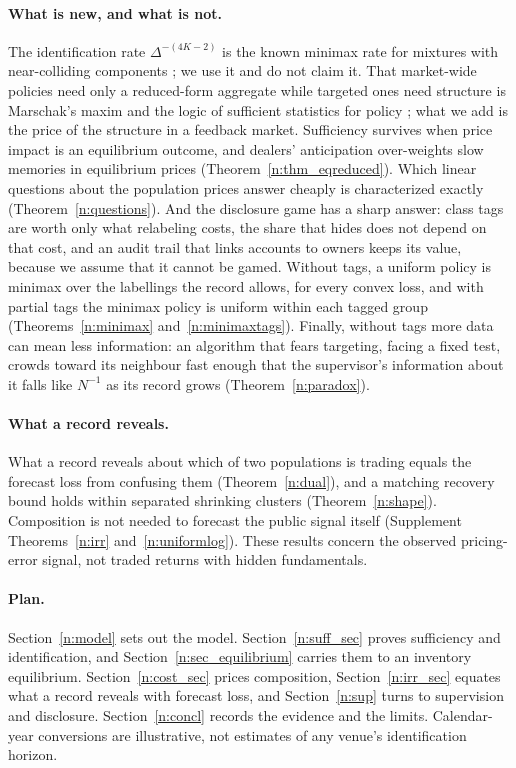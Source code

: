 \documentclass[12pt]{article}
\theoremstyle{definition}
\theoremstyle{remark}
\begin{document}
\paragraph{What is new, and what is not.} The identification rate $\Delta^{-(4K-2)}$ is the known minimax rate for mixtures with near-colliding components \citep{heinrich2018,wu2020}; we use it and do not claim it. That market-wide policies need only a reduced-form aggregate while targeted ones need structure is Marschak's maxim and the logic of sufficient statistics for policy \citep{marschak1953,chetty2009}; what we add is the price of the structure in a feedback market. Sufficiency survives when price impact is an equilibrium outcome, and dealers' anticipation over-weights slow memories in equilibrium prices (Theorem~\ref{n:thm_eqreduced}). Which linear questions about the population prices answer cheaply is characterized exactly (Theorem~\ref{n:questions}). And the disclosure game has a sharp answer: class tags are worth only what relabeling costs, the share that hides does not depend on that cost, and an audit trail that links accounts to owners keeps its value, because we assume that it cannot be gamed. Without tags, a uniform policy is minimax over the labellings the record allows, for every convex loss, and with partial tags the minimax policy is uniform within each tagged group (Theorems~\ref{n:minimax} and~\ref{n:minimaxtags}). Finally, without tags more data can mean less information: an algorithm that fears targeting, facing a fixed test, crowds toward its neighbour fast enough that the supervisor's information about it falls like $N^{-1}$ as its record grows (Theorem~\ref{n:paradox}).

\paragraph{What a record reveals.} What a record reveals about which of two populations is trading equals the forecast loss from confusing them (Theorem~\ref{n:dual}), and a matching recovery bound holds within separated shrinking clusters (Theorem~\ref{n:shape}). Composition is not needed to forecast the public signal itself (Supplement Theorems~\ref{n:irr} and~\ref{n:uniformlog}). These results concern the observed pricing-error signal, not traded returns with hidden fundamentals.

\paragraph{Plan.} Section~\ref{n:model} sets out the model. Section~\ref{n:suff_sec} proves sufficiency and identification, and Section~\ref{n:sec_equilibrium} carries them to an inventory equilibrium. Section~\ref{n:cost_sec} prices composition, Section~\ref{n:irr_sec} equates what a record reveals with forecast loss, and Section~\ref{n:sup} turns to supervision and disclosure. Section~\ref{n:concl} records the evidence and the limits. Calendar-year conversions are illustrative, not estimates of any venue's identification horizon.
\end{document}
